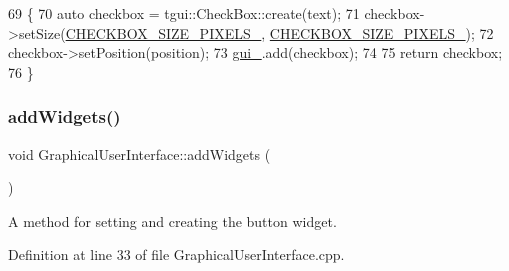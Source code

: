 \begin{DoxyCode}
69                                                                                            \{
70     \textcolor{keyword}{auto} checkbox = tgui::CheckBox::create(text);
71     checkbox->setSize(\hyperlink{classGraphicalUserInterface_afe4127bf0dbfbba90ec15fea6e046379}{CHECKBOX\_SIZE\_PIXELS\_}, 
      \hyperlink{classGraphicalUserInterface_afe4127bf0dbfbba90ec15fea6e046379}{CHECKBOX\_SIZE\_PIXELS\_});
72     checkbox->setPosition(position);
73     \hyperlink{classGraphicalUserInterface_ab07abda0fdb8e2965b70d2024fa3cf20}{gui\_}.add(checkbox);
74 
75     \textcolor{keywordflow}{return} checkbox;
76 \}
\end{DoxyCode}
\mbox{\label{classGraphicalUserInterface_a48e6dcc9acc179fdb74e67a51d66efb7}} 
\subsubsection{\texorpdfstring{add\+Widgets()}{addWidgets()}}
{\footnotesize\ttfamily void Graphical\+User\+Interface\+::add\+Widgets (\begin{DoxyParamCaption}{ }\end{DoxyParamCaption})}



A method for setting and creating the button widget. 



Definition at line 33 of file Graphical\+User\+Interface.\+cpp.


